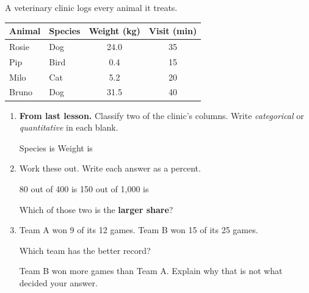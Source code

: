 \documentclass[12pt]{article}
\begin{document}

\vspace{0.24in}

\boxguard[16]
\begin{hookbox}
A veterinary clinic logs every animal it treats.

\vspace{8pt}
\begin{center}
\renewcommand{\arraystretch}{1.4}
\begin{tabular}{@{} l l c c @{}}
\rowcolor{sky}
\textbf{Animal} & \textbf{Species} & \textbf{Weight (kg)} & \textbf{Visit (min)} \\
\hline
Rosie & Dog  & 24.0 & 35 \\
Pip   & Bird &  0.4 & 15 \\
Milo  & Cat  &  5.2 & 20 \\
Bruno & Dog  & 31.5 & 40 \\
\hline
\end{tabular}
\end{center}
\vspace{4pt}
\end{hookbox}

\vspace{0.26in}

\begin{enumerate}[leftmargin=1.9em, itemsep=0.34in]

  \item \textbf{From last lesson.} Classify two of the clinic's columns. Write
        \emph{categorical} or \emph{quantitative} in each blank.

        \vspace{10pt}
        \hspace{1.0em} Species is \blank{4.4cm} \hfill Weight is \blank{4.4cm}
        \hspace{1.0em}

  \item Work these out. Write each answer as a percent.
        \vspace{10pt}

        \hspace{1.0em} 80 out of 400 is \blank{3.0cm}
        \hfill
        150 out of 1{,}000 is \blank{3.0cm}
        \hspace{1.0em}
        \vspace{12pt}

        Which of those two is the \textbf{larger share}? \blank{3.4cm}

  \item Team A won 9 of its 12 games. Team B won 15 of its 25 games.

        \vspace{8pt}
        Which team has the better record? \blank{4.6cm}
        \vspace{10pt}

        Team B won more games than Team A. Explain why that is not what decided your
        answer.\\[10pt]
        \writeline\\[10pt]\writeline

\end{enumerate}
\end{document}
